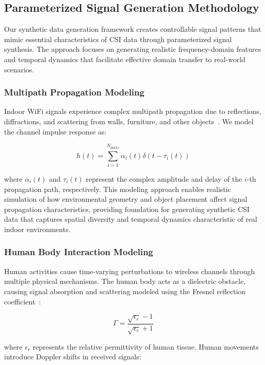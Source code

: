 \documentclass[journal]{IEEEtran}
\begin{document}
\subsection{Parameterized Signal Generation Methodology}

Our synthetic data generation framework creates controllable signal patterns that mimic essential characteristics of CSI data through parameterized signal synthesis. The approach focuses on generating realistic frequency-domain features and temporal dynamics that facilitate effective domain transfer to real-world scenarios.

\subsubsection{Multipath Propagation Modeling}

Indoor WiFi signals experience complex multipath propagation due to reflections, diffractions, and scattering from walls, furniture, and other objects~\cite{multipath_fading2003}. We model the channel impulse response as:

\begin{equation}
h(t) = \sum_{i=1}^{N_{paths}} \alpha_i(t) \delta(t - \tau_i(t))
\end{equation}

where $\alpha_i(t)$ and $\tau_i(t)$ represent the complex amplitude and delay of the $i$-th propagation path, respectively. This modeling approach enables realistic simulation of how environmental geometry and object placement affect signal propagation characteristics, providing foundation for generating synthetic CSI data that captures spatial diversity and temporal dynamics characteristic of real indoor environments.

\subsubsection{Human Body Interaction Modeling}

Human activities cause time-varying perturbations to wireless channels through multiple physical mechanisms. The human body acts as a dielectric obstacle, causing signal absorption and scattering modeled using the Fresnel reflection coefficient~\cite{fresnel_reflection1995}:

\begin{equation}
\Gamma = \frac{\sqrt{\epsilon_r} - 1}{\sqrt{\epsilon_r} + 1}
\end{equation}

where $\epsilon_r$ represents the relative permittivity of human tissue. Human movements introduce Doppler shifts in received signals:
\end{document}
